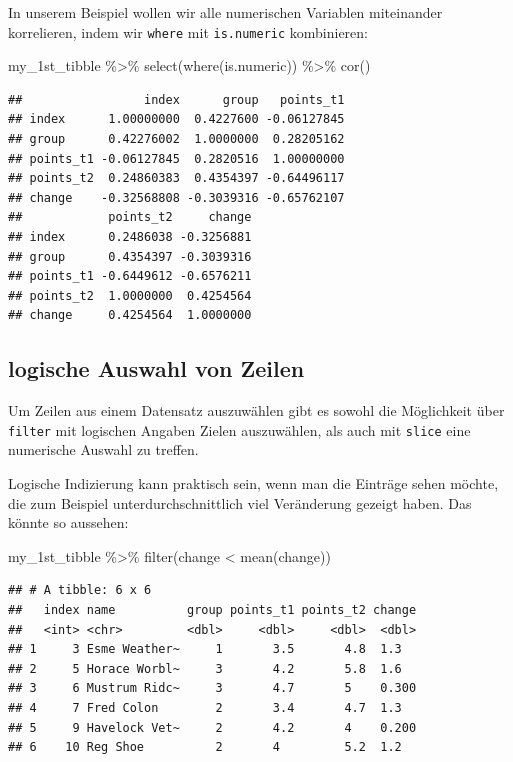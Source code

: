 \documentclass[
]{book}
\newenvironment{Shaded}{\begin{snugshade}}{\end{snugshade}}
\newcommand{\FunctionTok}[1]{\textcolor[rgb]{0.00,0.00,0.00}{#1}}
\newcommand{\NormalTok}[1]{#1}
\newcommand{\SpecialCharTok}[1]{\textcolor[rgb]{0.00,0.00,0.00}{#1}}
\begin{document}
In unserem Beispiel wollen wir alle numerischen Variablen miteinander korrelieren, indem wir \texttt{where} mit \texttt{is.numeric} kombinieren:

\begin{Shaded}
\begin{Highlighting}[]
\NormalTok{my\_1st\_tibble }\SpecialCharTok{\%\textgreater{}\%} 
  \FunctionTok{select}\NormalTok{(}\FunctionTok{where}\NormalTok{(is.numeric)) }\SpecialCharTok{\%\textgreater{}\%} 
  \FunctionTok{cor}\NormalTok{()}
\end{Highlighting}
\end{Shaded}

\begin{verbatim}
##                 index      group   points_t1
## index      1.00000000  0.4227600 -0.06127845
## group      0.42276002  1.0000000  0.28205162
## points_t1 -0.06127845  0.2820516  1.00000000
## points_t2  0.24860383  0.4354397 -0.64496117
## change    -0.32568808 -0.3039316 -0.65762107
##            points_t2     change
## index      0.2486038 -0.3256881
## group      0.4354397 -0.3039316
## points_t1 -0.6449612 -0.6576211
## points_t2  1.0000000  0.4254564
## change     0.4254564  1.0000000
\end{verbatim}

\hypertarget{logische-auswahl-von-zeilen}{%
\subsection{logische Auswahl von Zeilen}\label{logische-auswahl-von-zeilen}}

Um Zeilen aus einem Datensatz auszuwählen gibt es sowohl die Möglichkeit über \texttt{filter} mit logischen Angaben Zielen auszuwählen, als auch mit \texttt{slice} eine numerische Auswahl zu treffen.

Logische Indizierung kann praktisch sein, wenn man die Einträge sehen möchte, die zum Beispiel unterdurchschnittlich viel Veränderung gezeigt haben. Das könnte so aussehen:

\begin{Shaded}
\begin{Highlighting}[]
\NormalTok{my\_1st\_tibble }\SpecialCharTok{\%\textgreater{}\%} 
  \FunctionTok{filter}\NormalTok{(change }\SpecialCharTok{\textless{}} \FunctionTok{mean}\NormalTok{(change))}
\end{Highlighting}
\end{Shaded}

\begin{verbatim}
## # A tibble: 6 x 6
##   index name          group points_t1 points_t2 change
##   <int> <chr>         <dbl>     <dbl>     <dbl>  <dbl>
## 1     3 Esme Weather~     1       3.5       4.8  1.3  
## 2     5 Horace Worbl~     3       4.2       5.8  1.6  
## 3     6 Mustrum Ridc~     3       4.7       5    0.300
## 4     7 Fred Colon        2       3.4       4.7  1.3  
## 5     9 Havelock Vet~     2       4.2       4    0.200
## 6    10 Reg Shoe          2       4         5.2  1.2
\end{verbatim}
\end{document}

